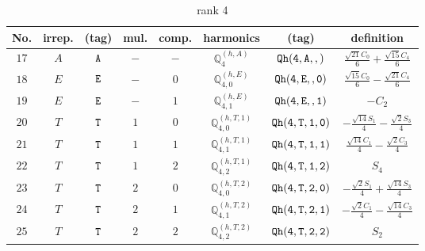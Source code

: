 \documentclass[fleqn,8pt]{jsarticle}
\begin{document}
\begin{table}[ht!]
\begin{center}
\caption{rank 4}
\renewcommand{\arraystretch}{1.3}
\begin{tabular}{cccccccc} \hline \hline
No. & irrep. & (tag) & mul. & comp. & harmonics & (tag) & definition \\ \hline
$ 17 $ & $ A $ & $ {\tt A} $ & $ - $ & $ - $ & $ \mathbb{Q}_{4}^{(h,A)} $ & $ {\tt Qh(4,A,,)} $ & $ \frac{\sqrt{21} C_{0}}{6} + \frac{\sqrt{15} C_{4}}{6} $ \\
$ 18 $ & $ E $ & $ {\tt E} $ & $ - $ & $ 0 $ & $ \mathbb{Q}_{4,0}^{(h,E)} $ & $ {\tt Qh(4,E,,0)} $ & $ \frac{\sqrt{15} C_{0}}{6} - \frac{\sqrt{21} C_{4}}{6} $ \\
$ 19 $ & $ E $ & $ {\tt E} $ & $ - $ & $ 1 $ & $ \mathbb{Q}_{4,1}^{(h,E)} $ & $ {\tt Qh(4,E,,1)} $ & $ - C_{2} $ \\
$ 20 $ & $ T $ & $ {\tt T} $ & $ 1 $ & $ 0 $ & $ \mathbb{Q}_{4,0}^{(h,T,1)} $ & $ {\tt Qh(4,T,1,0)} $ & $ - \frac{\sqrt{14} S_{1}}{4} - \frac{\sqrt{2} S_{3}}{4} $ \\
$ 21 $ & $ T $ & $ {\tt T} $ & $ 1 $ & $ 1 $ & $ \mathbb{Q}_{4,1}^{(h,T,1)} $ & $ {\tt Qh(4,T,1,1)} $ & $ \frac{\sqrt{14} C_{1}}{4} - \frac{\sqrt{2} C_{3}}{4} $ \\
$ 22 $ & $ T $ & $ {\tt T} $ & $ 1 $ & $ 2 $ & $ \mathbb{Q}_{4,2}^{(h,T,1)} $ & $ {\tt Qh(4,T,1,2)} $ & $ S_{4} $ \\
$ 23 $ & $ T $ & $ {\tt T} $ & $ 2 $ & $ 0 $ & $ \mathbb{Q}_{4,0}^{(h,T,2)} $ & $ {\tt Qh(4,T,2,0)} $ & $ - \frac{\sqrt{2} S_{1}}{4} + \frac{\sqrt{14} S_{3}}{4} $ \\
$ 24 $ & $ T $ & $ {\tt T} $ & $ 2 $ & $ 1 $ & $ \mathbb{Q}_{4,1}^{(h,T,2)} $ & $ {\tt Qh(4,T,2,1)} $ & $ - \frac{\sqrt{2} C_{1}}{4} - \frac{\sqrt{14} C_{3}}{4} $ \\
$ 25 $ & $ T $ & $ {\tt T} $ & $ 2 $ & $ 2 $ & $ \mathbb{Q}_{4,2}^{(h,T,2)} $ & $ {\tt Qh(4,T,2,2)} $ & $ S_{2} $ \\
 \hline \hline
\end{tabular}
\end{center}
\end{table}
\end{document}
